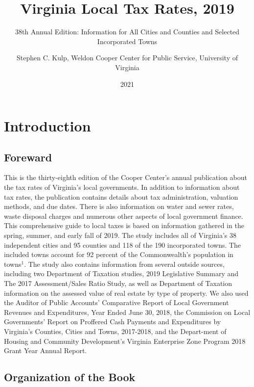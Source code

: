 \documentclass[
]{book}
\title{Virginia Local Tax Rates, 2019}
\subtitle{38th Annual Edition: Information for All Cities and Counties and Selected Incorporated Towns}
\author{Stephen C. Kulp, Weldon Cooper Center for Public Service, University of Virginia}
\date{2021}
\begin{document}
\maketitle

{
\setcounter{tocdepth}{1}
\tableofcontents
}
\hypertarget{introduction}{%
\chapter{Introduction}\label{introduction}}

\hypertarget{foreward}{%
\section{Foreward}\label{foreward}}

This is the thirty-eighth edition of the Cooper Center's annual publication about the tax rates of Virginia's local governments. In addition to information about tax rates, the publication contains details about tax administration, valuation methods, and due dates. There is also information on water and sewer rates, waste disposal charges and numerous other aspects of local government finance. This comprehensive guide to local taxes is based on information gathered in the spring, summer, and early fall of 2019. The study includes all of Virginia's 38 independent cities and 95 counties and 118 of the 190 incorporated towns. The included towns account for 92 percent of the Commonwealth's population in towns\(^1\). The study also contains information from several outside sources, including two Department of Taxation studies, 2019 Legislative Summary and The 2017 Assessment/Sales Ratio Study, as well as Department of Taxation information on the assessed value of real estate by type of property. We also used the Auditor of Public Accounts' Comparative Report of Local Government Revenues and Expenditures, Year Ended June 30, 2018, the Commission on Local Governments' Report on Proffered Cash Payments and Expenditures by Virginia's Counties, Cities and Towns, 2017-2018, and the Depart-ment of Housing and Community Development's Virginia Enterprise Zone Program 2018 Grant Year Annual Report.

\hypertarget{organization-of-the-book}{%
\section{Organization of the Book}\label{organization-of-the-book}}
\end{document}
